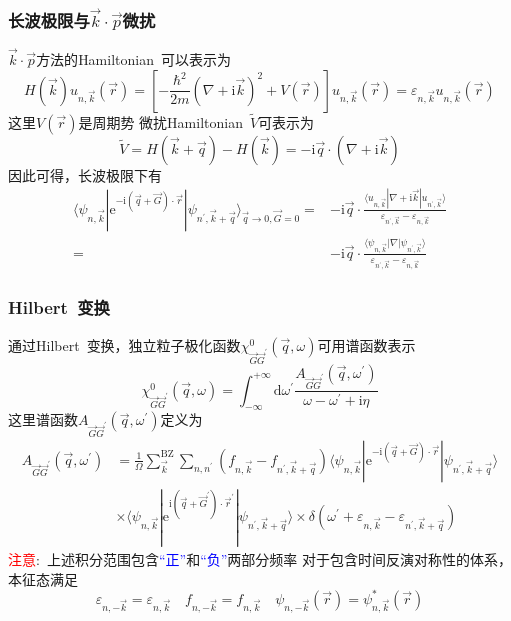 \documentclass[cjk,slidestop,compress,mathserif,blue]{beamer}
\begin{document}
\frame
{
	\frametitle{长波极限与$\vec k\cdot\vec p$微扰}
	$\vec k\cdot\vec p$方法的\textrm{Hamiltonian~}可以表示为
	\begin{displaymath}
		H(\vec k)u_{n,\vec k}(\vec r)=\left[ -\frac{\hbar^2}{2m}(\nabla+\mathrm{i}\vec k)^2+V(\vec r) \right]u_{n,\vec k}(\vec r)=\varepsilon_{n,\vec k}u_{n,\vec k}(\vec r)
	\end{displaymath}
	这里$V(\vec r)$是周期势
	\vskip 5pt
	微扰\textrm{Hamiltonian~}$\tilde V$可表示为
	\begin{displaymath}
		\tilde V=H(\vec k+\vec q)-H(\vec k)=-\mathrm{i}\vec q\cdot(\nabla+\mathrm{i}\vec k)
	\end{displaymath}
	因此可得，长波极限下有
	\begin{displaymath}
		\begin{aligned}
			\langle\psi_{n,\vec k}|\mathrm{e}^{-\mathrm{i}(\vec q+\vec G)\cdot\vec r}|\psi_{n^{\prime},\vec k+\vec q}\rangle_{\vec q\rightarrow0,\vec G=0}=&-\mathrm{i}\vec q\cdot\frac{\langle u_{n,\vec k}|\nabla+\mathrm{i}\vec k|u_{n^{\prime},\vec k}\rangle}{\varepsilon_{n^{\prime},\vec k}-\varepsilon_{n,\vec k}}\\
			=&-\mathrm{i}\vec q\cdot\frac{\langle\psi_{n,\vec k}|\nabla|\psi_{n^{\prime},\vec k}\rangle}{\varepsilon_{n^{\prime},\vec k}-\varepsilon_{n,\vec k}}
		\end{aligned}
	\end{displaymath}
}

\frame
{
	\frametitle{\textrm{Hilbert~}变换}
	通过\textrm{Hilbert~}变换，独立粒子极化函数$\chi_{\vec G\vec G^{\prime}}^0(\vec q,\omega)$可用谱函数表示
	\begin{displaymath}
		\chi_{\vec G\vec G^{\prime}}^0(\vec q,\omega)=\int_{-\infty}^{+\infty}\mathrm{d}\omega^{\prime}\frac{A_{\vec G\vec G^{\prime}}(\vec q,\omega^{\prime})}{\omega-\omega^{\prime}+\mathrm{i}\eta}
	\end{displaymath}
	这里谱函数$A_{\vec G\vec G^{\prime}}(\vec q,\omega^{\prime})$定义为
	\begin{displaymath}
		\begin{aligned}
			A_{\vec G\vec G^{\prime}}(\vec q,\omega^{\prime})&=\frac1{\Omega}\sum_{\vec k}^{\mathrm{BZ}}\sum_{n,n^{\prime}}(f_{n,\vec k}-f_{n^{\prime},\vec k+\vec q})\langle\psi_{n,\vec k}|\mathrm{e}^{-\mathrm{i}(\vec q+\vec G)\cdot\vec r}|\psi_{n^{\prime},\vec k+\vec q}\rangle\\
			&\times\langle\psi_{n,\vec k}|\mathrm{e}^{\mathrm{i}(\vec q+\vec G^{\prime})\cdot\vec r^{\prime}}|\psi_{n^{\prime},\vec k+\vec q}\rangle\times\delta(\omega^{\prime}+\varepsilon_{n,\vec k}-\varepsilon_{n^{\prime},\vec k+\vec q})
		\end{aligned}
	\end{displaymath}
	\textcolor{red}{注意}:~上述积分范围包含\textcolor{blue}{“正”}和\textcolor{blue}{“负”}两部分频率
	\vskip 5pt
	对于包含时间反演对称性的体系，本征态满足
	\begin{displaymath}
		\varepsilon_{n,-\vec k}=\varepsilon_{n,\vec k}\quad f_{n,-\vec k}=f_{n,\vec k}\quad\psi_{n,-\vec k}(\vec r)=\psi_{n,\vec k}^{\ast}(\vec r)
	\end{displaymath}
}
\end{document}

